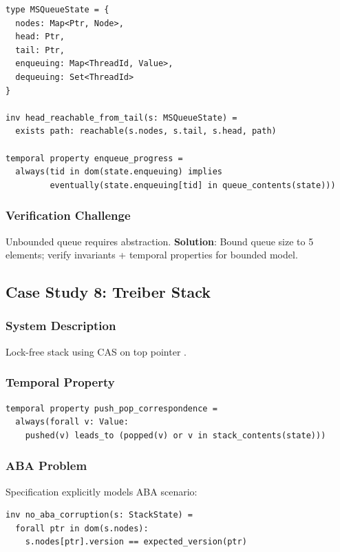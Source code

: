 \documentclass[conference]{IEEEtran}
\begin{document}
\begin{lstlisting}
type MSQueueState = {
  nodes: Map<Ptr, Node>,
  head: Ptr,
  tail: Ptr,
  enqueuing: Map<ThreadId, Value>,
  dequeuing: Set<ThreadId>
}

inv head_reachable_from_tail(s: MSQueueState) =
  exists path: reachable(s.nodes, s.tail, s.head, path)

temporal property enqueue_progress =
  always(tid in dom(state.enqueuing) implies
         eventually(state.enqueuing[tid] in queue_contents(state)))
\end{lstlisting}

\subsubsection{Verification Challenge}

Unbounded queue requires abstraction. \textbf{Solution}: Bound queue size to 5 elements; verify invariants + temporal properties for bounded model.

\subsection{Case Study 8: Treiber Stack}

\subsubsection{System Description}

Lock-free stack using CAS on top pointer \cite{treiber1986}.

\subsubsection{Temporal Property}

\begin{lstlisting}
temporal property push_pop_correspondence =
  always(forall v: Value:
    pushed(v) leads_to (popped(v) or v in stack_contents(state)))
\end{lstlisting}

\subsubsection{ABA Problem}

Specification explicitly models ABA scenario:

\begin{lstlisting}
inv no_aba_corruption(s: StackState) =
  forall ptr in dom(s.nodes):
    s.nodes[ptr].version == expected_version(ptr)
\end{lstlisting}
\end{document}
